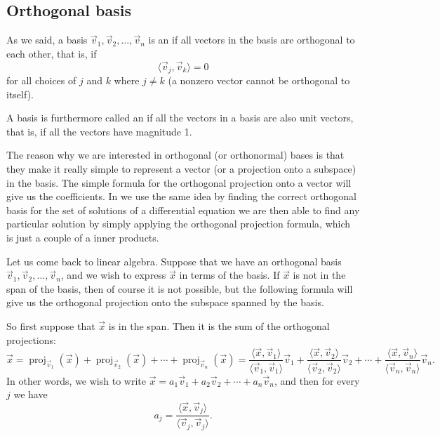 \subsection{Orthogonal basis}

As we said, a basis $\vec{v}_1,\vec{v}_2,\ldots,\vec{v}_n$
is an \emph{} if all vectors in the
basis are orthogonal to each other, that is, if
\begin{equation*}
\langle \vec{v}_j , \vec{v}_k \rangle = 0
\end{equation*}
for all choices of $j$ and $k$ where $j \not= k$ (a nonzero vector cannot be
orthogonal to itself).

A basis is furthermore called an \emph{} if all
the vectors in a basis are also unit vectors, that is, if all the vectors
have magnitude 1.

The reason why we are interested in orthogonal (or orthonormal) bases is
that they make it really simple to represent a vector (or a projection onto
a subspace) in the basis.  The simple formula for the orthogonal projection
onto a vector will give us the coefficients.  In 
 we use the same idea by finding the correct 
orthogonal basis for the set of solutions of a differential equation we
are then able to find any particular solution by simply applying the
orthogonal projection formula, which is just a couple of a inner products.

Let us come back to linear algebra.  Suppose that we have an orthogonal
basis $\vec{v}_1, \vec{v}_2, \ldots, \vec{v}_n$, and we wish to
express $\vec{x}$ in terms of the basis.  If $\vec{x}$ is not in the span
of the basis, then of course it is not possible, but the following formula
will give us the orthogonal projection onto the subspace spanned by the
basis.

So first suppose that $\vec{x}$ is in the span.  Then it is the sum of the
orthogonal projections:
\begin{equation*}
\vec{x} = 
\operatorname{proj}_{\vec{v}_1} ( \vec{x} )
+
\operatorname{proj}_{\vec{v}_2} ( \vec{x} )
+
\cdots
+
\operatorname{proj}_{\vec{v}_n} ( \vec{x} )
=
\frac{\langle \vec{x}, \vec{v}_1 \rangle}{
\langle \vec{v}_1, \vec{v}_1 \rangle
}
\vec{v}_1
+
\frac{\langle \vec{x}, \vec{v}_2 \rangle}{
\langle \vec{v}_2, \vec{v}_2 \rangle
}
\vec{v}_2
+
\cdots
+
\frac{\langle \vec{x}, \vec{v}_n \rangle}{
\langle \vec{v}_n, \vec{v}_n \rangle
}
\vec{v}_n .
\end{equation*}
In other words, we wish to write
$\vec{x} =
a_1 \vec{v}_1 + 
a_2 \vec{v}_2 + \cdots +
a_n \vec{v}_n$, and then for every $j$ we have
\begin{equation*}
a_j = 
\frac{\langle \vec{x}, \vec{v}_j \rangle}{
\langle \vec{v}_j, \vec{v}_j \rangle
} .
\end{equation*}

